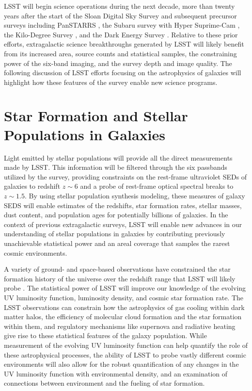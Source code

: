 {LSST will begin science operations during the next decade,
more than twenty years after the start of the Sloan
Digital Sky Survey \citep{york2000a} and subsequent precursor surveys
including PanSTARRS \citep{kaiser2010a}, the Subaru
survey with Hyper Suprime-Cam \citep{miyazaki2012a}, the
Kilo-Degree Survey \citep{dejong2015a}, and the Dark
Energy Survey \citep{flaugher2005a}. Relative to these prior
efforts, extragalactic science breakthroughs
generated by LSST will likely benefit from its increased area, source
counts and statistical samples, the constraining power of the
six-band imaging, and the survey depth and image quality. The following
discussion of LSST efforts focusing on the astrophysics of galaxies
will highlight how these features of the survey enable new science
programs.



\section{Star Formation and Stellar Populations in Galaxies}
\label{sec:sci:gal:bkgnd:stars}

Light emitted by stellar populations will
provide all the direct measurements made by
LSST. This information will be filtered through
the six passbands utilized by the survey,
providing constraints on the
rest-frame ultraviolet SEDs of galaxies to
redshift $z\sim6$ and a probe of rest-frame
optical spectral breaks to $z\sim1.5$. By
using stellar population synthesis modeling,
these measures of galaxy SEDS will enable 
estimates of the redshifts, star formation rates,
stellar masses, dust content, and 
population ages for potentially 
billions of galaxies. In the context of previous
extragalactic surveys, LSST
will enable new advances in our understanding
of stellar populations in galaxies by contributing
previously unachievable statistical power and an
areal coverage that samples the rarest cosmic
environments.

A variety of ground- and space-based observations
have constrained the
star formation history of the universe over the
redshift range that LSST will likely probe
\citep[for a recent review, see][]{madau2014a}.
The statistical power of LSST will improve our
knowledge of the evolving UV luminosity function,
luminosity density, and cosmic
star formation rate. The LSST observations can
constrain how the astrophysics of gas
cooling within dark matter halos, the efficiency
of molecular cloud formation and the star formation
within them, and
regulatory mechanisms like supernova and radiative
heating give rise to these statistical features
of the galaxy population. While measurement of
the evolving UV luminosity function can
help quantify the role of these 
astrophysical processes, the ability of LSST
to probe vastly different cosmic environments
will also allow for the robust quantification of any
changes in the UV luminosity function with
environmental density, and an examination of 
connections between environment and the fueling
of star formation.

}
